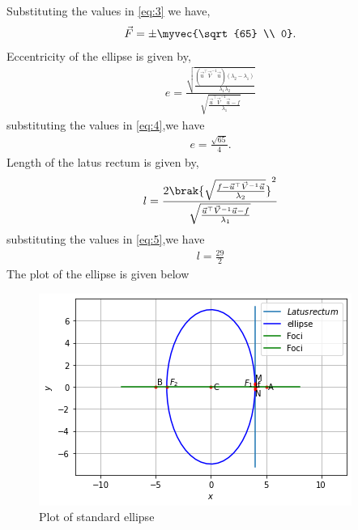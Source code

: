 \documentclass[journal,12pt,twocolumn]{IEEEtran}
\begin{document}
Substituting the values in \eqref{eq:3} we have,
\begin{align}
    \vec{F} = \pm\myvec{\sqrt{65} \\ 0}.
\end{align}
Eccentricity of the ellipse is given by,
\begin{align}
   e = \frac{\sqrt{\frac{(\vec{u}^{\top}\vec{V}^{-1}\vec{u})(\lambda_2-\lambda_1)}{\lambda_1\lambda_2}}}{\sqrt{\frac{\vec{u}^{\top}\vec{V}^{-1}\vec{u}-f}{\lambda_1}}} \label{eq:4}
\end{align}
substituting the values in \eqref{eq:4},we have
\begin{align}
   e = \frac{\sqrt{65}}{4}.
\end{align}
Length of the latus rectum is given by,
\begin{align}
    l = \frac{2\brak{{\sqrt{\frac{f-\vec{u}^{\top}\vec{V}^{-1}\vec{u}}{\lambda_2}}}}^2}{\sqrt{\frac{\vec{u}^{\top}\vec{V}^{-1}\vec{u}-f}{\lambda_1}}} \label{eq:5}
\end{align}
substituting the values in \eqref{eq:5},we have
\begin{align}
   l = \frac{29}{2}
\end{align}
The plot of the ellipse is given below
\begin{figure}[ht]
\centering
\includegraphics[width=\columnwidth]{ellipse 7.png}
\caption{Plot of standard ellipse}
\label{Plot of standard ellipse}
\end{figure}
\end{document}
